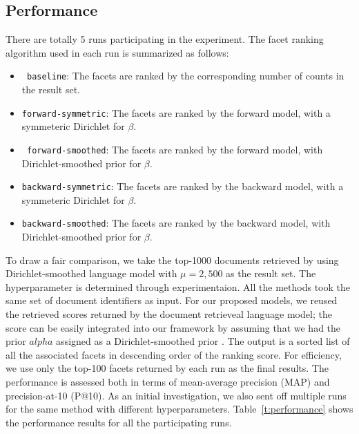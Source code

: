 \subsection{Performance}\label{ss:performance}

There are totally 5 runs participating in the experiment.  The facet ranking
algorithm used in each run is summarized as follows: \begin{itemize} \item {\tt
baseline}:  The facets are ranked by the corresponding number of counts in the
result set.  \item {\tt forward-symmetric}:  The facets are ranked by the
forward model, with a symmeteric Dirichlet for $\beta$.  \item {\tt
forward-smoothed}:  The facets are ranked by the forward model, with
Dirichlet-smoothed prior for $\beta$.  \item {\tt backward-symmetric}:  The
facets are ranked by the backward model, with a symmeteric Dirichlet for
$\beta$.  \item {\tt backward-smoothed}:  The facets are ranked by the backward
model, with Dirichlet-smoothed prior for $\beta$.  \end{itemize}

To draw a fair comparison, we take the top-1000 documents retrieved by using
Dirichlet-smoothed language model with $\mu = 2,500$ as the result set.  The
hyperparameter is determined through experimentaion.  All the methods took the
same set of document identifiers as input.  For our proposed models, we reused
the retrieved scores returned by the document retrieveal language model; the
score can be easily integrated into our framework by assuming that we had the
prior $alpha$ assigned as a Dirichlet-smoothed prior .  The output is a sorted list of all the associated
facets in descending order of the ranking score.  For efficiency, we use only
the top-100 facets returned by each run as the final results.  The performance
is assessed both in terms of mean-average precision (MAP) and precision-at-10
(P@10).  As an initial investigation, we also sent off multiple runs for the
same method with different hyperparameters.  Table~\ref{t:performance} shows
the performance results for all the participating runs.

